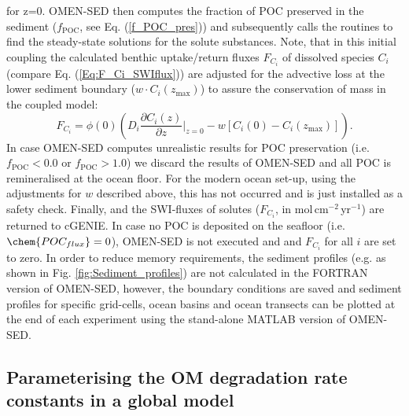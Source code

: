 \documentclass[gmd, manuscript]{copernicus}
\begin{document}
for z=0. 
OMEN-SED then computes the fraction of POC preserved in the sediment ($f_{\mathrm{POC}}$, see Eq. (\ref{f_POC_pres})) and subsequently calls the routines to find the steady-state 
solutions for the solute substances. Note, that in this initial coupling the calculated benthic uptake/return fluxes $F_{C_i}$ of dissolved species $C_i$ (compare Eq. (\ref{Eq:F_Ci_SWIflux})) are 
adjusted for the advective loss at the lower sediment boundary ($w \cdot C_i(z_\mathrm{max})$) to assure the conservation of mass in the coupled model:
\begin{equation}
 F_{C_i} = \phi(0) \left(D_i \frac{\partial C_i(z)}{\partial z}\bigg\rvert_{z=0} - w \left[ C_i(0) - C_i(z_\mathrm{max}) \right]\right).
\end{equation}
In case OMEN-SED computes unrealistic results for POC preservation (i.e. $f_{\mathrm{POC}} < 0.0$ or $f_{\mathrm{POC}} > 1.0$) we discard the results of OMEN-SED and all POC is remineralised at the ocean floor. 
For the modern ocean set-up, using the adjustments for $w$ described above, this has not occurred and is just installed as a safety check. 
Finally,  and the SWI-fluxes of solutes ($F_{C_i}$, in mol\,cm$^{-2}$\,yr$^{-1}$) are returned to cGENIE. 
In case no POC is deposited on the seafloor (i.e. $\chem{POC_{flux}}=0$), OMEN-SED is not executed and  and $F_{C_i}$ for all $i$ are set to zero. 
In order to reduce memory requirements, the sediment profiles (e.g. as shown in Fig. \ref{fig:Sediment_profiles}) are not calculated in the FORTRAN version of OMEN-SED, 
however, the boundary conditions are saved and sediment profiles for specific grid-cells, ocean basins and ocean transects can be plotted at the end of each experiment 
using the stand-alone MATLAB version of OMEN-SED.


\subsection{Parameterising the OM degradation rate constants in a global model}\label{subsec:Parameterising_OM_rate_const}
\end{document}
